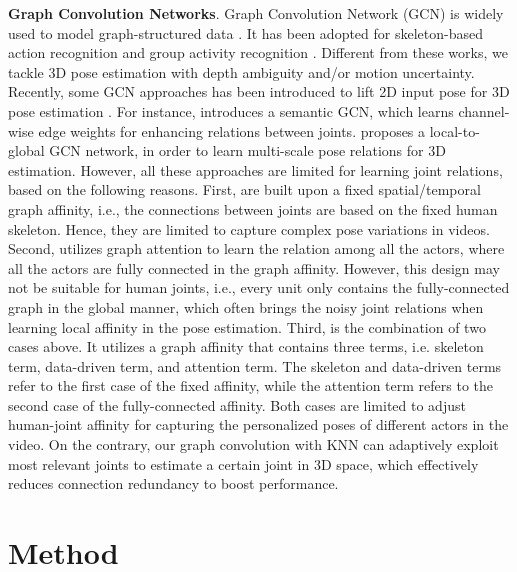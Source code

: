 \documentclass[journal]{IEEEtran}
\begin{document}
\textbf{Graph Convolution Networks}.
Graph Convolution Network (GCN) is widely used to model graph-structured data \cite{HenaffarXiv2015,LiICLR2016,Bronstein2017,maxgcn,PetarICLR18}.
It has been adopted for skeleton-based action recognition \cite{stgcn} and group activity recognition \cite{wu2019learning}.
Different from these works,
we tackle 3D pose estimation with depth ambiguity and/or motion uncertainty.
Recently,
some GCN approaches has been introduced to lift 2D input pose for 3D pose estimation \cite{semanticsgcn,dynamicgraph_gesture,Ci_2019_ICCV,Cai_2019_ICCV}.
For instance,
\cite{semanticsgcn} introduces a semantic GCN,
which learns channel-wise edge weights for enhancing relations between joints.
\cite{Cai_2019_ICCV} proposes a local-to-global GCN network,
in order to learn multi-scale pose relations for 3D estimation.
However,
all these approaches are limited for learning joint relations,
based on the following reasons.
First,
\cite{stgcn,semanticsgcn,Cai_2019_ICCV} are built upon a fixed spatial/temporal graph affinity,
i.e.,
the connections between joints are based on the fixed human skeleton.
Hence,
they are limited to capture complex pose variations in videos.
Second,
\cite{wu2019learning} utilizes graph attention to learn the relation among all the actors,
where
all the actors are fully connected in the graph affinity.
However,
this design may not be suitable for human joints,
i.e.,
every unit only contains the fully-connected graph in the global manner,
which often brings the noisy joint relations when learning local affinity in the pose estimation.
Third,
\cite{Shi_2019_CVPR} is the combination of two cases above.
It utilizes a graph affinity that contains three terms,
i.e.
skeleton term,
data-driven term,
and
attention term.
The skeleton and data-driven terms refer to the first case of the fixed affinity,
while
the attention term refers to the second case of the fully-connected affinity.
Both cases are limited to adjust human-joint affinity for capturing the personalized poses of different actors in the video.
On the contrary,
our graph convolution with KNN can adaptively exploit most relevant joints to estimate a certain joint in 3D space,
which effectively reduces connection redundancy to boost performance.














\section{Method}
\label{Method}
\end{document}
